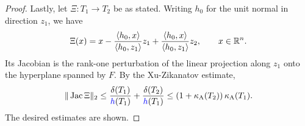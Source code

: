 \documentclass[10pt,a4paper]{article}
\newcommand{\mwl}[1]{{\color{red}#1}}
\begin{document}
\begin{proof}

    Lastly, let $\Xi : T_1 \rightarrow T_2$ be as stated. 
    Writing $h_0$ for the unit normal in direction $z_1$, we have 
    \begin{align*}
        \Xi(x) 
        = 
        x 
        - \frac{ \langle h_0, x \rangle }{ \langle h_0, z_1 \rangle } z_1
        + \frac{ \langle h_0, x \rangle }{ \langle h_0, z_1 \rangle } z_2
        ,
        \qquad 
        x \in {\mathbb R}^{n}
        .
    \end{align*}
    Its Jacobian is the rank-one perturbation of the linear projection along $z_1$ onto the hyperplane spanned by $F$. 
    By the Xu-Zikanatov estimate,
    \begin{align*}
        \matnorm{ \Jacobian \Xi }
        \leq 
        \frac{ \diam(T_1) }{ \height(T_1) }
        +
        \frac{ \diam(T_2) }{ \height(T_1) }
        \leq 
        \left( 1 + \aspectratio(T_2) \right)
        \aspectratio(T_1)
        .
    \end{align*}
    The desired estimates are shown.

\end{proof}
\end{document}
